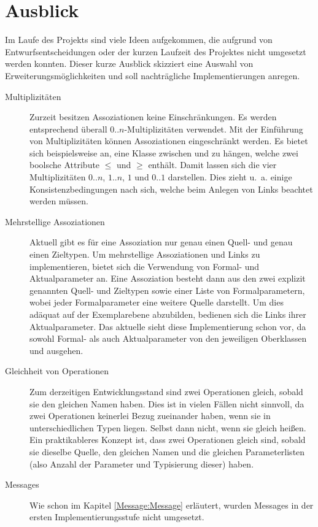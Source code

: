 \section{Ausblick}
Im Laufe des Projekts sind viele Ideen aufgekommen, die aufgrund von Entwurfsentscheidungen oder der kurzen Laufzeit des Projektes 
nicht umgesetzt werden konnten. Dieser kurze Ausblick skizziert eine Auswahl von Erweiterungsmöglichkeiten und 
soll nachträgliche Implementierungen anregen.

\begin{description}
  \item[Multiplizitäten] Zurzeit besitzen Assoziationen keine Einschränkungen. 
	Es werden entsprechend überall $0..n$-Multiplizitäten verwendet. 
	Mit der Einführung von Multiplizitäten können Assoziationen eingeschränkt werden.
	Es bietet sich beispielsweise an, eine Klasse  zwischen  und  zu hängen,
	welche zwei boolsche Attribute $\leq$ und $\geq$ enthält. Damit lassen sich die vier Multiplizitäten $0..n$, $1..n$, $1$ und $0..1$ darstellen.
	Dies zieht u.~a. einige Konsistenzbedingungen nach sich, welche beim Anlegen von Links beachtet werden müssen. 
  \item[Mehrstellige Assoziationen] Aktuell gibt es für eine Assoziation nur genau einen Quell- und genau einen Zieltypen. 
  	Um mehrstellige Assoziationen und Links zu implementieren, bietet sich die Verwendung von Formal- und Aktualparameter an. 
  	Eine Assoziation besteht dann aus den zwei explizit genannten Quell- und Zieltypen sowie einer Liste von Formalparametern, 
  	wobei jeder Formalparameter eine weitere Quelle darstellt. Um dies adäquat auf der Exemplarebene abzubilden, 
  	bedienen sich die Links ihrer Aktualparameter. Das aktuelle \MM sieht diese Implementierung schon vor, da sowohl 
  	Formal- als auch Aktualparameter von den jeweiligen Oberklassen  und  ausgehen.
  \item[Gleichheit von Operationen] Zum derzeitigen Entwicklungsstand sind zwei Operationen gleich, sobald sie den gleichen Namen haben. 
  	Dies ist in vielen Fällen nicht	sinnvoll, da zwei Operationen keinerlei Bezug zueinander haben, wenn sie in unterschiedlichen Typen liegen. 
  	Selbst dann nicht, wenn sie gleich heißen. Ein praktikableres Konzept ist, dass zwei Operationen gleich sind, sobald sie dieselbe Quelle, 
  	den gleichen Namen und die gleichen Parameterlisten (also Anzahl der Parameter und Typisierung dieser) haben. 
  \item[Messages] Wie schon im Kapitel \ref{Message:Message} erläutert, wurden Messages in der ersten Implementierungsstufe nicht umgesetzt. 

\end{description}
